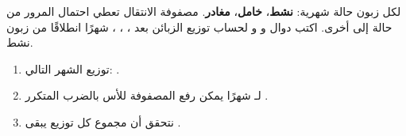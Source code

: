 \begin{statement}
لكل زبون حالة شهرية: \textbf{نشط}، \textbf{خامل}، \textbf{مغادر}. مصفوفة الانتقال  تعطي احتمال المرور من حالة إلى أخرى. اكتب دوال  و  و  لحساب توزيع الزبائن بعد ، ، ،  شهرًا انطلاقًا من  زبون نشط.
\end{statement}
\begin{stepsbox}\begin{enumerate}
\item توزيع الشهر التالي: .
\item لـ  شهرًا يمكن رفع المصفوفة للأس بالضرب المتكرر .
\item نتحقق أن مجموع كل توزيع يبقى .
\end{enumerate}\end{stepsbox}
